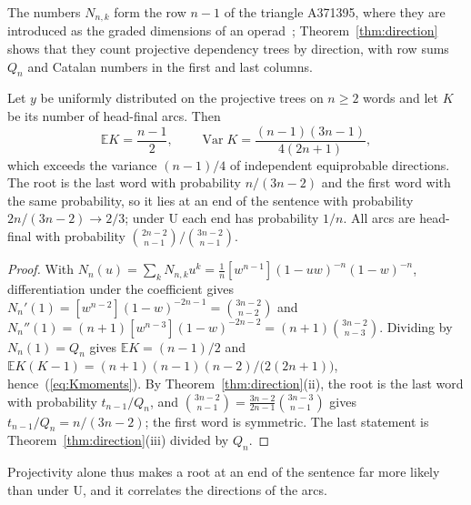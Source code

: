\documentclass[mathematics,article,submit,pdftex,oneauthor]{Definitions/mdpi}
\newcommand{\E}{\mathbb E}
\newcommand{\Var}{\operatorname{Var}}
\begin{document}
The numbers $N_{n,k}$ form the row $n-1$ of the triangle A371395, where they are introduced as the graded dimensions of an operad~\cite{OEIS_A371395}; Theorem~\ref{thm:direction} shows that they count projective dependency trees by direction, with row sums $Q_n$ and Catalan numbers in the first and last columns.

\begin{Corollary}\label{cor:direction}
Let $y$ be uniformly distributed on the projective trees on $n\geqslant2$ words and let $K$ be its number of head-final arcs. Then
\begin{equation}\label{eq:Kmoments}
\E K=\frac{n-1}{2},\qquad \Var K=\frac{(n-1)(3n-1)}{4(2n+1)},
\end{equation}
which exceeds the variance $(n-1)/4$ of independent equiprobable directions.
The root is the last word with probability $n/(3n-2)$ and the first word with the same probability, so it lies at an end of the sentence with probability $2n/(3n-2)\to2/3$; under U each end has probability $1/n$.
All arcs are head-final with probability $\binom{2n-2}{n-1}\big/\binom{3n-2}{n-1}$.
\end{Corollary}
\begin{proof}
With $N_n(u)=\sum_kN_{n,k}u^k=\frac1n[w^{n-1}](1-uw)^{-n}(1-w)^{-n}$, differentiation under the coefficient gives $N_n'(1)=[w^{n-2}](1-w)^{-2n-1}=\binom{3n-2}{n-2}$ and $N_n''(1)=(n+1)[w^{n-3}](1-w)^{-2n-2}=(n+1)\binom{3n-2}{n-3}$.
Dividing by $N_n(1)=Q_n$ gives $\E K=(n-1)/2$ and $\E K(K-1)=(n+1)(n-1)(n-2)/\bigl(2(2n+1)\bigr)$, hence~(\ref{eq:Kmoments}).
By Theorem~\ref{thm:direction}(ii), the root is the last word with probability $t_{n-1}/Q_n$, and $\binom{3n-2}{n-1}=\frac{3n-2}{2n-1}\binom{3n-3}{n-1}$ gives $t_{n-1}/Q_n=n/(3n-2)$; the first word is symmetric.
The last statement is Theorem~\ref{thm:direction}(iii) divided by $Q_n$.
\end{proof}

Projectivity alone thus makes a root at an end of the sentence far more likely than under U, and it correlates the directions of the arcs.
\end{document}
